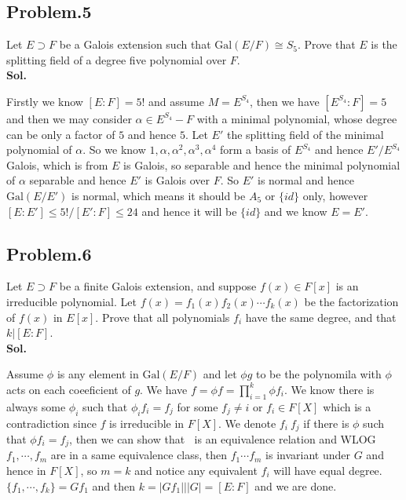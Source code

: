 \documentclass[lang=en,11pt,a4paper,citestyle =authoryear]{elegantpaper}
\begin{document}
\subsection*{Problem.5} 
Let $E \supset F$ be a Galois extension such that $\text{Gal}(E/F) \cong S_5$. Prove that $E$ is the splitting field of a degree five polynomial over $F$.
\vspace{0.5em}\\
\textbf{Sol.} \par
    Firstly we know $[E:F] = 5!$ and assume $M = E^{S_4}$, then we have $[E^{S_4}:F] = 5$ and then we may consider $\alpha \in E^{S_4} - F$ with a minimal polynomial, whose degree can be only a factor of $5$ and hence $5$. Let $E'$ the splitting field of the minimal polynomial of $\alpha$. So we know $1,\alpha,\alpha^2,\alpha^3,\alpha^4$ form a basis of $E^{S_4}$ and hence $E'/E^{S_4}$ Galois, which is from $E$ is Galois, so separable and hence the minimal polynomial of $\alpha$ separable and hence $E'$ is Galois over $F$. So $E'$ is normal and hence $\text{Gal}(E/E')$ is normal, which means it should be $A_5$ or $\{id\}$ only, however $[E:E'] \leq 5!/[E':F] \leq 24$ and hence it will be $\{id\}$ and we know $E= E'$.
\par 
\vspace{0.5em}

\subsection*{Problem.6} 
Let $E \supset F$ be a finite Galois extension, and suppose $f(x) \in F[x]$ is an irreducible polynomial. Let $f(x) = f_1(x)f_2(x)\cdots f_k(x)$ be the factorization of $f(x)$ in $E[x]$. Prove that all polynomials $f_i$ have the same degree, and that $k|[E:F]$.
\vspace{0.5em}\\
\textbf{Sol.} \par
   Assume $\phi$ is any element in $\text{Gal}(E/F)$ and let $\phi g$ to be the polynomila with $\phi$ acts on each coeeficient of $g$. We have $f = \phi f = \prod_{i=1}^k \phi f_i$. We know there is always some $\phi_i$ such that $\phi_i f_i = f_j$ for some $f_j \neq i$ or $f_i \in F[X]$ which is a contradiction since $f$ is irreducible in $F[X]$. We denote $f_i ~ f_j$ if there is $\phi$ such that $\phi f_i = f_j$, then we can show that $~$ is an equivalence relation and WLOG $f_1,\cdots,f_m$ are in a same equivalence class, then $f_1\cdots f_m$ is invariant under $G$ and hence in $F[X]$, so $m = k$ and notice any equivalent $f_i$ will have equal degree. $\{f_1,\cdots,f_k\} = Gf_1$ and then $k = |Gf_1| | |G| = [E:F]$ and we are done.
\par 
\vspace{0.5em}

\addappheadtotoc
\end{document}
